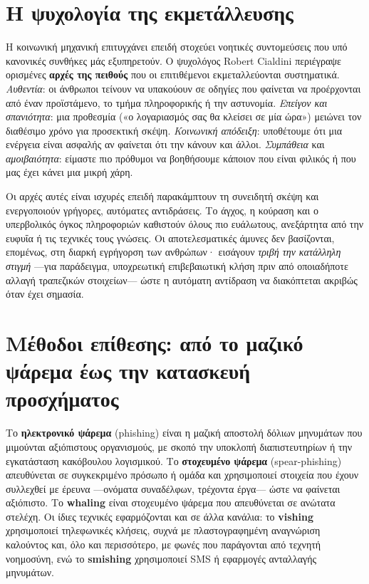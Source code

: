 \section{Η ψυχολογία της εκμετάλλευσης}\label{sec:5.1}
Η κοινωνική μηχανική επιτυγχάνει επειδή στοχεύει νοητικές συντομεύσεις που υπό κανονικές συνθήκες μάς εξυπηρετούν. Ο ψυχολόγος Robert Cialdini περιέγραψε ορισμένες \textbf{αρχές της πειθούς} που οι επιτιθέμενοι εκμεταλλεύονται συστηματικά. \emph{Αυθεντία}: οι άνθρωποι τείνουν να υπακούουν σε οδηγίες που φαίνεται να προέρχονται από έναν προϊστάμενο, το τμήμα πληροφορικής ή την αστυνομία. \emph{Επείγον και σπανιότητα}: μια προθεσμία («ο λογαριασμός σας θα κλείσει σε μία ώρα») μειώνει τον διαθέσιμο χρόνο για προσεκτική σκέψη. \emph{Κοινωνική απόδειξη}: υποθέτουμε ότι μια ενέργεια είναι ασφαλής αν φαίνεται ότι την κάνουν και άλλοι. \emph{Συμπάθεια} και \emph{αμοιβαιότητα}: είμαστε πιο πρόθυμοι να βοηθήσουμε κάποιον που είναι φιλικός ή που μας έχει κάνει μια μικρή χάρη.

Οι αρχές αυτές είναι ισχυρές επειδή παρακάμπτουν τη συνειδητή σκέψη και ενεργοποιούν γρήγορες, αυτόματες αντιδράσεις. Το άγχος, η κούραση και ο υπερβολικός όγκος πληροφοριών καθιστούν όλους πιο ευάλωτους, ανεξάρτητα από την ευφυΐα ή τις τεχνικές τους γνώσεις. Οι αποτελεσματικές άμυνες δεν βασίζονται, επομένως, στη διαρκή εγρήγορση των ανθρώπων· εισάγουν \emph{τριβή την κατάλληλη στιγμή} —για παράδειγμα, υποχρεωτική επιβεβαιωτική κλήση πριν από οποιαδήποτε αλλαγή τραπεζικών στοιχείων— ώστε η αυτόματη αντίδραση να διακόπτεται ακριβώς όταν έχει σημασία.

\section{Μέθοδοι επίθεσης: από το μαζικό ψάρεμα έως την κατασκευή προσχήματος}\label{sec:5.2}
Το \textbf{ηλεκτρονικό ψάρεμα} (phishing) είναι η μαζική αποστολή δόλιων μηνυμάτων που μιμούνται αξιόπιστους οργανισμούς, με σκοπό την υποκλοπή διαπιστευτηρίων ή την εγκατάσταση κακόβουλου λογισμικού. Το \textbf{στοχευμένο ψάρεμα} (spear-phishing) απευθύνεται σε συγκεκριμένο πρόσωπο ή ομάδα και χρησιμοποιεί στοιχεία που έχουν συλλεχθεί με έρευνα —ονόματα συναδέλφων, τρέχοντα έργα— ώστε να φαίνεται αξιόπιστο. Το \textbf{whaling} είναι στοχευμένο ψάρεμα που απευθύνεται σε ανώτατα στελέχη. Οι ίδιες τεχνικές εφαρμόζονται και σε άλλα κανάλια: το \textbf{vishing} χρησιμοποιεί τηλεφωνικές κλήσεις, συχνά με πλαστογραφημένη αναγνώριση καλούντος και, όλο και περισσότερο, με φωνές που παράγονται από τεχνητή νοημοσύνη, ενώ το \textbf{smishing} χρησιμοποιεί SMS ή εφαρμογές ανταλλαγής μηνυμάτων.

